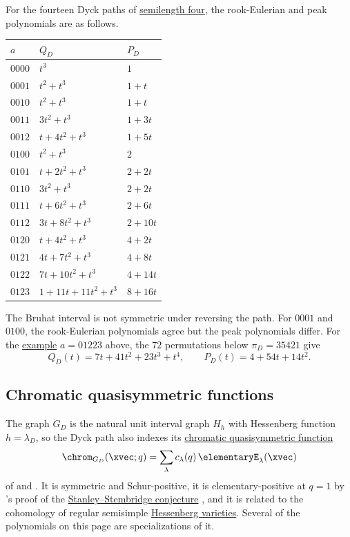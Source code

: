 \begin{example*}
For the fourteen Dyck paths of
\hyperref[dyckPathSemilengthFour]{semilength four}, the rook-Eulerian and peak
polynomials are as follows.

\begin{tabular}{lll}
\toprule
$a$ & $Q_D$ & $P_D$ \\
\midrule
$0000$ & $t^3$ & $1$ \\
$0001$ & $t^2+t^3$ & $1+t$ \\
$0010$ & $t^2+t^3$ & $1+t$ \\
$0011$ & $3t^2+t^3$ & $1+3t$ \\
$0012$ & $t+4t^2+t^3$ & $1+5t$ \\
$0100$ & $t^2+t^3$ & $2$ \\
$0101$ & $t+2t^2+t^3$ & $2+2t$ \\
$0110$ & $3t^2+t^3$ & $2+2t$ \\
$0111$ & $t+6t^2+t^3$ & $2+6t$ \\
$0112$ & $3t+8t^2+t^3$ & $2+10t$ \\
$0120$ & $t+4t^2+t^3$ & $4+2t$ \\
$0121$ & $4t+7t^2+t^3$ & $4+8t$ \\
$0122$ & $7t+10t^2+t^3$ & $4+14t$ \\
$0123$ & $1+11t+11t^2+t^3$ & $8+16t$ \\
\bottomrule
\end{tabular}

The Bruhat interval is not symmetric under reversing the path.  For $0001$ and
$0100$, the rook-Eulerian polynomials agree but the peak polynomials differ.
For the \hyperref[dyckPathRunningExample]{example} $a=01223$ above, the
$72$ permutations below $\pi_D=35421$ give
\[
  Q_D(t)=7t+41t^2+23t^3+t^4,\qquad P_D(t)=4+54t+14t^2.
\]
\end{example*}


\subsection[dyckPathGraphPolynomials]{Chromatic quasisymmetric functions}

The graph $G_D$ is the natural unit interval graph $H_h$ with Hessenberg
function $h=\lambda_D$, so the Dyck path also indexes its
\hyperref[chromaticQuasisymmetric]{chromatic quasisymmetric function}
\[
  \chrom_{G_D}(\xvec;q)=\sum_{\lambda}c_\lambda(q)\,\elementaryE_\lambda(\xvec)
\]
of  and 
\cite{ShareshianWachs2016}.  It is symmetric and Schur-positive, it is
elementary-positive at $q=1$ by 's proof of the
\hyperref[stanleyStembridgeConjecture]{Stanley--Stembridge conjecture}
\cite{Hikita2024x}, and it is related to the cohomology of regular
semisimple \hyperref[chromaticQuasisymmetricHessenberg]{Hessenberg
varieties}.  Several of the polynomials on this page are specializations of
it.

